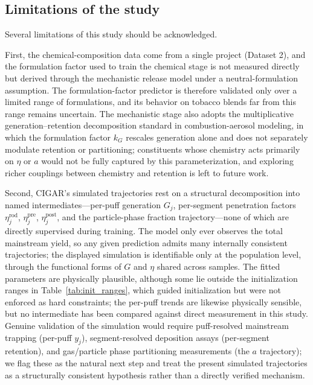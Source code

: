 \documentclass[11pt]{article}
\begin{document}
\subsection*{Limitations of the study}

Several limitations of this study should be acknowledged.

First, the chemical-composition data come from a single project (Dataset 2), and the formulation factor used to train the chemical stage is not measured directly but derived through the mechanistic release model under a neutral-formulation assumption. The formulation-factor predictor is therefore validated only over a limited range of formulations, and its behavior on tobacco blends far from this range remains uncertain. The mechanistic stage also adopts the multiplicative generation--retention decomposition standard in combustion-aerosol modeling, in which the formulation factor $k_G$ rescales generation alone and does not separately modulate retention or partitioning; constituents whose chemistry acts primarily on $\eta$ or $a$ would not be fully captured by this parameterization, and exploring richer couplings between chemistry and retention is left to future work.

Second, CIGAR's simulated trajectories rest on a structural decomposition into named intermediates---per-puff generation $G_j$, per-segment penetration factors $\eta^{\mathrm{rod}}_j$, $\eta^{\mathrm{pre}}_j$, $\eta^{\mathrm{post}}_j$, and the particle-phase fraction trajectory---none of which are directly supervised during training. The model only ever observes the total mainstream yield, so any given prediction admits many internally consistent trajectories; the displayed simulation is identifiable only at the population level, through the functional forms of $G$ and $\eta$ shared across samples. The fitted parameters are physically plausible, although some lie outside the initialization ranges in Table~\ref{tab:init_ranges}, which guided initialization but were not enforced as hard constraints; the per-puff trends are likewise physically sensible, but no intermediate has been compared against direct measurement in this study. Genuine validation of the simulation would require puff-resolved mainstream trapping (per-puff $y_j$), segment-resolved deposition assays (per-segment retention), and gas/particle phase partitioning measurements (the $a$ trajectory); we flag these as the natural next step and treat the present simulated trajectories as a structurally consistent hypothesis rather than a directly verified mechanism.
\end{document}
